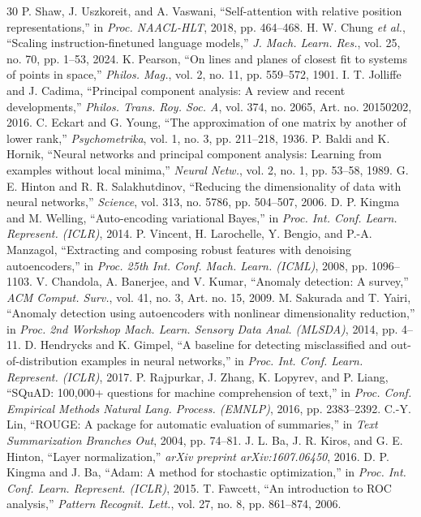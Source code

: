 \documentclass[conference]{IEEEtran}
\begin{document}
\begin{thebibliography}{30}
 P. Shaw, J. Uszkoreit, and A. Vaswani, ``Self-attention with relative position representations,'' in \emph{Proc. NAACL-HLT}, 2018, pp. 464--468.
 H. W. Chung \emph{et al.}, ``Scaling instruction-finetuned language models,'' \emph{J. Mach. Learn. Res.}, vol. 25, no. 70, pp. 1--53, 2024.
 K. Pearson, ``On lines and planes of closest fit to systems of points in space,'' \emph{Philos. Mag.}, vol. 2, no. 11, pp. 559--572, 1901.
 I. T. Jolliffe and J. Cadima, ``Principal component analysis: A review and recent developments,'' \emph{Philos. Trans. Roy. Soc. A}, vol. 374, no. 2065, Art. no. 20150202, 2016.
 C. Eckart and G. Young, ``The approximation of one matrix by another of lower rank,'' \emph{Psychometrika}, vol. 1, no. 3, pp. 211--218, 1936.
 P. Baldi and K. Hornik, ``Neural networks and principal component analysis: Learning from examples without local minima,'' \emph{Neural Netw.}, vol. 2, no. 1, pp. 53--58, 1989.
 G. E. Hinton and R. R. Salakhutdinov, ``Reducing the dimensionality of data with neural networks,'' \emph{Science}, vol. 313, no. 5786, pp. 504--507, 2006.
 D. P. Kingma and M. Welling, ``Auto-encoding variational Bayes,'' in \emph{Proc. Int. Conf. Learn. Represent. (ICLR)}, 2014.
 P. Vincent, H. Larochelle, Y. Bengio, and P.-A. Manzagol, ``Extracting and composing robust features with denoising autoencoders,'' in \emph{Proc. 25th Int. Conf. Mach. Learn. (ICML)}, 2008, pp. 1096--1103.
 V. Chandola, A. Banerjee, and V. Kumar, ``Anomaly detection: A survey,'' \emph{ACM Comput. Surv.}, vol. 41, no. 3, Art. no. 15, 2009.
 M. Sakurada and T. Yairi, ``Anomaly detection using autoencoders with nonlinear dimensionality reduction,'' in \emph{Proc. 2nd Workshop Mach. Learn. Sensory Data Anal. (MLSDA)}, 2014, pp. 4--11.
 D. Hendrycks and K. Gimpel, ``A baseline for detecting misclassified and out-of-distribution examples in neural networks,'' in \emph{Proc. Int. Conf. Learn. Represent. (ICLR)}, 2017.
 P. Rajpurkar, J. Zhang, K. Lopyrev, and P. Liang, ``SQuAD: 100,000+ questions for machine comprehension of text,'' in \emph{Proc. Conf. Empirical Methods Natural Lang. Process. (EMNLP)}, 2016, pp. 2383--2392.
 C.-Y. Lin, ``ROUGE: A package for automatic evaluation of summaries,'' in \emph{Text Summarization Branches Out}, 2004, pp. 74--81.
 J. L. Ba, J. R. Kiros, and G. E. Hinton, ``Layer normalization,'' \emph{arXiv preprint arXiv:1607.06450}, 2016.
 D. P. Kingma and J. Ba, ``Adam: A method for stochastic optimization,'' in \emph{Proc. Int. Conf. Learn. Represent. (ICLR)}, 2015.
 T. Fawcett, ``An introduction to ROC analysis,'' \emph{Pattern Recognit. Lett.}, vol. 27, no. 8, pp. 861--874, 2006.
\end{thebibliography}
\end{document}
